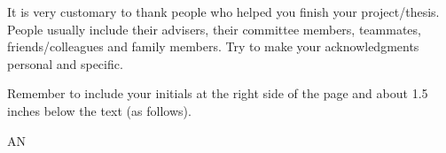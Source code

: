 It is very customary to thank people who helped you finish your project/thesis. People usually include their advisers, their committee members, teammates, friends/colleagues and family members. Try to make your acknowledgments personal and specific.

Remember to include your initials at the right side of the page and about 1.5 inches below the text (as follows).

\vspace{60pt}
\hfill AN